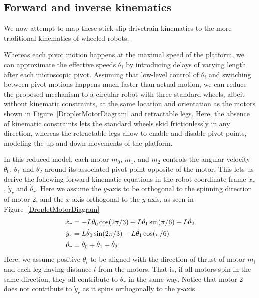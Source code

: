 \documentclass[letterpaper, 10pt, conference]{ieeeconf}
\begin{document}



\subsection{Forward and inverse kinematics}
We now attempt to map these stick-slip drivetrain kinematics to the more traditional kinematics of wheeled robots.

Whereas each pivot motion happens at the maximal speed of the platform, we can approximate the effective speeds $\theta_i$ by introducing delays of varying length after each microscopic pivot. Assuming that low-level control of $\theta_i$ and switching between pivot motions happens much faster than actual motion, we can reduce the proposed mechanism to a circular robot with three standard wheels, albeit without kinematic constraints, at the same location and orientation as the motors shown in Figure~\ref{DropletMotorDiagram} and retractable legs. Here, the absence of kinematic constraints lets the standard wheels skid frictionlessly in any direction, whereas the retractable legs allow to enable and disable pivot points, modeling the up and down movements of the platform. 

In this reduced model, each motor $m_0$, $m_1$, and $m_2$ controls the angular velocity $\dot{\theta}_0$, $\dot{\theta}_1$ and $\dot{\theta}_2$ around its associated pivot point opposite of the motor. This lets us derive the following forward kinematic equations in the robot coordinate frame $\dot{x}_r$, $\dot{y}_r$ and $\dot{\theta}_r$.
Here we assume the $y$-axis to be orthogonal to the spinning direction of motor 2, and the $x$-axis orthogonal to the $y$-axis, as seen in Figure~\ref{DropletMotorDiagram}
\begin{align}\label{eq:fwd}
\dot{x}_r & = -L \dot{\theta}_0 \cos(2 \pi / 3) + L \dot{\theta}_1 \sin(\pi / 6) + L \dot{\theta}_2\notag\\
\dot{y}_r & =  L \dot{\theta}_0 \sin(2 \pi / 3) - L \dot{\theta}_1 \cos(\pi / 6)\notag\\
\dot{\theta}_r & = \dot{\theta}_0 + \dot{\theta}_1 + \dot{\theta}_2
\end{align}
Here, we assume positive $\theta_i$ to be aligned with the direction of thrust of motor $m_i$ and each leg having distance $l$ from the motors. That is, if all motors spin in the same direction, they all contribute to $\dot{\theta}_r$ in the same way. Notice that motor 2 does not contribute to $\dot{y}_r$ as it spins orthogonally to the y-axis.
\end{document}
